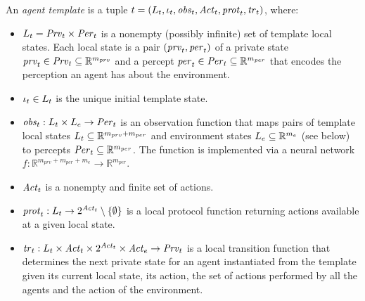 \begin{definition}
An {\em agent template} is a tuple ${t} = \left ( L_{t}, \iota_{t}, \mathit{obs}_{t},
\mathit{Act}_{t}, \mathit{prot}_{t}, \mathit{tr}_{t}  \right )$, where:
\begin{itemize}[$\bullet$]\itemsep 0cm
  \item $L_{t} = \mathit{Prv}_{t} \times \mathit{Per}_{t}$ is a nonempty (possibly infinite)
  set of template local states.  Each local state  is a pair $\left ( \mathit{prv}_{t}, \mathit{per}_{t} \right )$ of
  a private state $\mathit{prv}_{t} \in \mathit{Prv}_{t} \subseteq \mathbb R^{m_{prv}}$ and a
  percept $\mathit{per}_{t} \in \mathit{Per}_{t} \subseteq \mathbb R^{m_{per}}$ that encodes the
  perception an agent has about the environment.  

  \item $\iota_{t} \in L_{t}$ is the unique initial template state.
  
  \item $\mathit{obs}_{t} : L_{t} \times L_{e} \rightarrow \mathit{Per}_{t}$ is an
  observation function that maps pairs of template local states $L_{t}
  \subseteq \mathbb{R}^{m_{prv} + m_{per}}$ and environment states $L_{e}
  \subseteq \mathbb{R}^{m_e}$ (see below) to percepts $\mathit{Per}_{t} \subseteq
  \mathbb{R}^{m_{per}}$. The function is implemented via a neural
  network $f : \mathbb{R}^{m_{prv} + m_{per} + m_e} \rightarrow
  \mathbb{R}^{m_{per}}$.

  \item $\mathit{Act}_{t}$ is a nonempty and finite set of actions.
  
  \item
    $\mathit{prot}_{t} : L_{t} \rightarrow 2^{\mathit{Act}_{t}} \setminus \left \{ \emptyset \right \}$ is
    a local protocol function returning actions available at a given local
    state.

  \item $\mathit{tr}_{t}: L_{t} \times \mathit{Act}_{t} \times 2^{\mathit{Act}_{t}} \times \mathit{Act}_{e} 
  \rightarrow \mathit{Prv}_{t}$ is a local transition function  that determines the next
  private state for an agent instantiated from the template given its current local state, its action, 
  the set of actions performed by all the agents  and the action of the
  environment.
  
\end{itemize}  
\end{definition}


